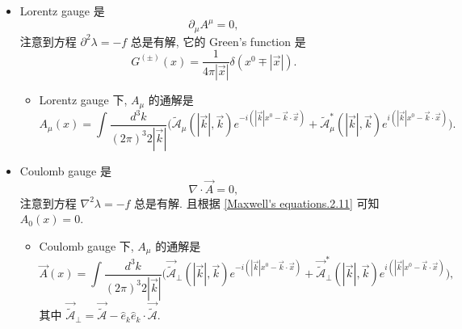 \begin{itemize}
	\item Lorentz gauge 是
	\begin{equation}
		\partial_\mu A^\mu = 0,
	\end{equation}
	注意到方程 $\partial^2 \lambda = - f$ 总是有解, 它的 Green's function 是
	\begin{equation}
		G^{(\pm)}(x) = \frac{1}{4 \pi |\vec{x}|} \delta(x^0 \mp |\vec{x}|).
	\end{equation}
	\begin{itemize}
		\item Lorentz gauge 下, $A_\mu$ 的通解是
		\begin{equation}
			A_\mu(x) = \int \frac{d^3 k}{(2 \pi)^3 2 |\vec{k}|} \Big( \tilde{\mathcal{A}}_\mu(|\vec{k}|, \vec{k}) e^{- i (|\vec{k}| x^0 - \vec{k} \cdot \vec{x})} + \tilde{\mathcal{A}}^*_\mu(|\vec{k}|, \vec{k}) e^{i (|\vec{k}| x^0 - \vec{k} \cdot \vec{x})} \Big).
		\end{equation}
	\end{itemize}
	
	\item Coulomb gauge 是
	\begin{equation}
		\nabla \cdot \vec{A} = 0,
	\end{equation}
	注意到方程 $\nabla^2 \lambda = - f$ 总是有解. 且根据 \eqref{Maxwell's equations.2.11} 可知 $A_0(x) = 0$.
	\begin{itemize}
		\item Coulomb gauge 下, $A_\mu$ 的通解是
		\begin{equation}
			\vec{A}(x) = \int \frac{d^3 k}{(2 \pi)^3 2 |\vec{k}|} \Big( \vec{\tilde{\mathcal{A}}}_\perp(|\vec{k}|, \vec{k}) e^{- i (|\vec{k}| x^0 - \vec{k} \cdot \vec{x})} + \vec{\tilde{\mathcal{A}}}^*_\perp(|\vec{k}|, \vec{k}) e^{i (|\vec{k}| x^0 - \vec{k} \cdot \vec{x})} \Big),
		\end{equation}
		其中 $\vec{\tilde{\mathcal{A}}}_\perp = \vec{\tilde{\mathcal{A}}} - \hat{e}_k \hat{e}_k \cdot \vec{\tilde{\mathcal{A}}}$.
	\end{itemize}
\end{itemize}
